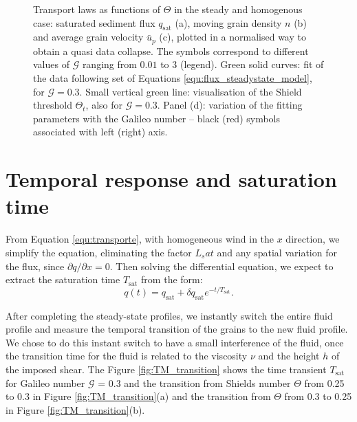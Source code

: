 \begin{figure}
    \caption[Transport laws for viscous bedload transport.]{Transport laws as functions of $\Theta$ in the steady and homogenous case: saturated sediment flux $q_\textrm{sat}$ (a), moving grain density $n$ (b) and average grain velocity $\bar{u}_p$ (c), plotted in a normalised way to obtain a quasi data collapse. The symbols correspond to different values of $\mathcal{G}$ ranging from $0.01$ to $3$ (legend). Green solid curves: fit of the data following set of Equations \ref{equ:flux_steadystate_model}, for $\mathcal{G}=0.3$. Small vertical green line: visualisation of the Shield threshold $\Theta_t$, also for $\mathcal{G}=0.3$. Panel (d): variation of the fitting parameters with the Galileo number -- black (red) symbols associated with left (right) axis.}
    \label{fig:TM_profiles}
\end{figure}

\section{Temporal response and saturation time}
\label{sec:Tsat}
    From Equation \ref{equ:transporte}, with homogeneous wind in the $x$ direction, we simplify the equation, eliminating the factor $L_sat$ and any spatial variation for the flux, since $\partial q/\partial x = 0$. Then solving the differential equation, we expect to extract the saturation time $T_\textrm{sat}$ from the form:
\begin{equation}
    q(t) = q_\textrm{sat} + \delta q_\textrm{sat} e^{-t/T_\textrm{sat}}.
\end{equation}

    After completing the steady-state profiles, we instantly switch the entire fluid profile and measure the temporal transition of the grains to the new fluid profile. We chose to do this instant switch to have a small interference of the fluid, once the transition time for the fluid is related to the viscosity $\nu$ and the height $h$ of the imposed shear. The Figure \ref{fig:TM_transition} shows the time transient $T_\textrm{sat}$ for Galileo number $\mathcal{G}$ = 0.3 and the transition from Shields number $\Theta$ from 0.25 to 0.3 in Figure \ref{fig:TM_transition}(a) and the transition from $\Theta$ from 0.3 to 0.25 in Figure \ref{fig:TM_transition}(b).

